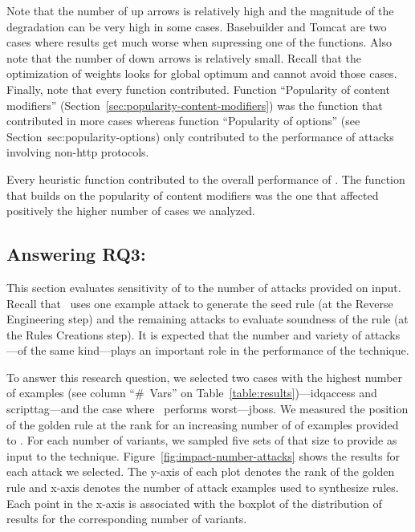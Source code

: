 \documentclass[sigconf,review, anonymous]{acmart}
\begin{document}
Note that the number of up arrows is relatively high and the magnitude
of the degradation can be very high in some cases. Basebuilder and
Tomcat are two cases where results get much worse when supressing one
of the functions. Also note that the number of down arrows is
relatively small. Recall that the optimization of weights looks for
global optimum and cannot avoid those cases. Finally, note that every
function contributed. Function ``Popularity of content modifiers''
(Section~\ref{sec:popularity-content-modifiers}) was the function that
contributed in more cases whereas function ``Popularity of options''
(see Section~{sec:popularity-options}) only contributed to the
performance of attacks involving non-http protocols.


\begin{center}
\begin{tcolorbox}[enhanced,width=3.3in,center upper,drop shadow southwest,sharp corners]
Every heuristic function contributed to the overall performance of
\tname. The function that builds on the popularity of content
modifiers was the one that affected positively the higher number of
cases we analyzed.
\end{tcolorbox}
\end{center}

\subsection{Answering RQ3: \textRQthree}
\label{sec:answer-rqthree}

This section evaluates sensitivity of \tname{} to the number of
attacks provided on input. Recall that \tname\ uses one example attack
to generate the seed rule (at the Reverse Engineering step) and the
remaining attacks to evaluate soundness of the rule (at the Rules
Creations step). It is expected that the number and variety of
attacks---of the same kind---plays an important role in the
performance of the technique.

To answer this research question, we selected two cases with the
highest number of examples (see column ``\#~Vars'' on
Table~\ref{table:results})---idqaccess and scripttag---and the case
where \tname\ performs worst---jboss. We measured the position of the
golden rule at the rank for an increasing number of of examples
provided to \tname. For each number of variants, we sampled five sets
of that size to provide as input to the
technique. Figure~\ref{fig:impact-number-attacks} shows the results
for each attack we selected. The y-axis of each plot denotes the rank
of the golden rule and x-axis denotes the number of attack examples
used to synthesize rules. Each point in the x-axis is associated with
the boxplot of the distribution of results for the corresponding
number of variants.
 
\end{document}
